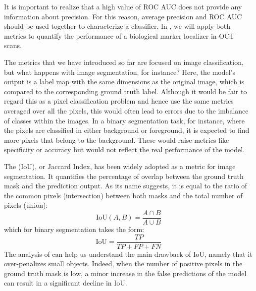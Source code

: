 It is important to realize that a high value of ROC AUC does not provide any information about precision. For this reason, average precision and ROC AUC should be used together to characterize a classifier. In , we will apply both metrics to quantify the performance of a biological marker localizer in OCT scans.

The metrics that we have introduced so far are focused on image classification, but what happens with image segmentation, for instance? Here, the model's output is a label map with the same dimensions as the original image, which is compared to the corresponding ground truth label. Although it would be fair to regard this as a pixel classification problem and hence use the same metrics averaged over all the pixels, this would often lead to errors due to the imbalance of classes within the images. In a binary segmentation task, for instance, where the pixels are classified in either background or foreground, it is expected to find more pixels that belong to the background. These would raise metrics like specificity or accuracy but would not reflect the real performance of the model.

The \textit{} (IoU), or Jaccard Index, has been widely adopted as a metric for image segmentation. It quantifies the percentage of overlap between the ground truth mask and the prediction output. As its name suggests, it is equal to the ratio of the common pixels (intersection) between both masks and the total number of pixels (union):
\begin{equation*}
    \text{IoU}(A,B) = \dfrac{A\cap B}{A \cup B}
\end{equation*}
which for binary segmentation takes the form:
\begin{equation}
    \text{IoU} = \dfrac{TP}{TP + FP + FN}
    \label{eq:iou}
\end{equation}
The analysis of  can help us understand the main drawback of IoU, namely that it over-penalizes small objects. Indeed, when the number of positive pixels in the ground truth mask is low, a minor increase in the false predictions of the model can result in a significant decline in IoU.
 
